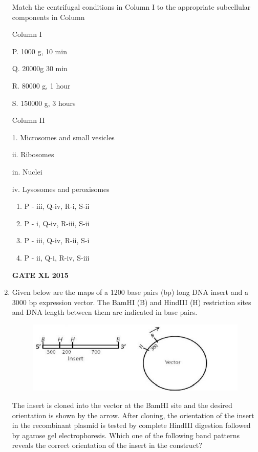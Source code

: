 \documentclass[journal,12pt,onecolumn]{IEEEtran}
\begin{document}
\begin{enumerate}
    
Match the centrifugal conditions in Column I to the appropriate subcellular components in Column
\begin{minipage}{0.5\textwidth}
	\begin{flushleft}
Column I

P. 1000 g, 10 min

Q. 20000g 30 min

R. 80000 g, 1 hour

S. 150000 g, 3 hours
	\end{flushleft}
\end{minipage}
\begin{minipage}{0.5\textwidth}
	\begin{flushleft}
Column II

1. Microsomes and small vesicles

ii. Ribosomes

in. Nuclei

iv. Lysosomes and peroxisomes
	\end{flushleft}
\end{minipage}
    \begin{enumerate}
            \item P - iii, Q-iv, R-i, S-ii
            \item P - i, Q-iv, R-iii, S-ii
            \item P - iii, Q-iv, R-ii, S-i
            \item P - ii, Q-i, R-iv, S-iii
    \end{enumerate}
\hfill{\textbf{GATE XL 2015}}
\item Given below are the maps of a 1200 base pairs (bp) long DNA insert and a 3000 bp expression vector. The BamHI (B) and HindIII (H) restriction sites and DNA length between them are indicated in base pairs.

	\begin{figure}[h!]
		\centering
	\includegraphics[width=\columnwidth]{45}
		    \caption*{}
		\label{fig:Q45}
	\end{figure}

The insert is cloned into the vector at the BamHI site and the desired orientation is shown by the arrow. After cloning, the orientation of the insert in the recombinant plasmid is tested by complete HindIII digestion followed by agarose gel electrophoresis. Which one of the following band patterns reveals the correct orientation of the insert in the construct?
    

\end{enumerate}
\end{document}
